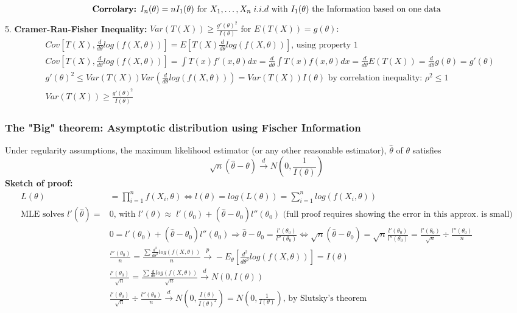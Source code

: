 \documentclass{article}
\begin{document}
\begin{align*}
    \textrm{\textbf{Corrolary:} } I_n(\theta) = nI_1(\theta) \textrm{ for } X_1, \dots, X_n \; i.i.d \textrm{ with } I_{1}(\theta) \textrm{ the Information based on one data}
\end{align*}
5. \textbf{Cramer-Rau-Fisher Inequality:} $Var(T(X)) \geq \frac{g'(\theta)^2}{I(\theta)} \textrm{ for } E(T(X)) = g(\theta):$
\begin{align*}
    & Cov[T(X), \frac{d}{d\theta}log(f(X, \theta))] = E[T(X)\frac{d}{d\theta}log(f(X, \theta))] \textrm{, using property 1}\\
    & Cov[T(X), \frac{d}{d\theta}log(f(X, \theta))] = \int T(x)f'(x, \theta)dx = \frac{d}{d\theta} \int T(x)  f(x, \theta)dx = \frac{d}{d\theta}E(T(X)) = \frac{d}{d\theta}g(\theta) = g'(\theta)\\
    &g'(\theta)^2 \leq Var(T(X))Var \left (\frac{d}{d\theta}log(f(X, \theta)) \right) = Var(T(X))I(\theta) \textrm{ by correlation inequality: } \rho^2 \leq 1\\
    &Var(T(X)) \geq \frac{g'(\theta)^2}{I(\theta)}
\end{align*}
\subsubsection{The "Big" theorem: Asymptotic distribution using Fischer Information}
Under regularity assumptions, the maximum likelihood estimator (or any other reasonable estimator), $\hat{\theta}$ of $\theta$ satisfies
\begin{equation*}
    \sqrt{n}(\hat{\theta} - \theta) \overset{d}{\longrightarrow} N\left(0, \frac{1}{I(\theta)}\right)
\end{equation*}
\textbf{Sketch of proof:}
\begin{align*}
    L(\theta) &= \prod_{i=1}^nf(X_i, \theta) \Longleftrightarrow l(\theta) = log(L(\theta)) = \sum_{i=1}^nlog(f(X_i, \theta))\\
    \textrm{MLE solves } l'(\hat{\theta}) = &0 \textrm{, with } l'(\theta) \approx \; l'(\theta_0) + (\hat{\theta} - \theta_0)l''(\theta_0) \textrm{ (full proof requires showing the error in this approx. is small)}\\
    &0 = l'(\theta_0) + (\hat{\theta} - \theta_0)l''(\theta_0) \Longrightarrow \hat{\theta} - \theta_0 = \frac{l'(\theta_0)}{l''(\theta_0)} \Longleftrightarrow \sqrt{n}(\hat{\theta} - \theta_0) = \sqrt{n}\frac{l'(\theta_0)}{l''(\theta_0)} = \frac{l'(\theta_0)}{\sqrt{n}} \div \frac{l''(\theta_0)}{n}\\
    & \frac{l''(\theta_0)}{n} = \frac{\sum \frac{d^2}{d\theta^2}log(f(X, \theta))}{n} \overset{p}{\longrightarrow}  - E_\theta \left [\frac{d^2}{d\theta^2}log(f(X, \theta)) \right ] = I(\theta)\\
    & \frac{l'(\theta_0)}{\sqrt{n}} = \frac{\sum \frac{d}{d\theta}log(f(X, \theta))}{\sqrt{n}} \overset{d}{\longrightarrow} N(0, I(\theta))\\
    & \frac{l'(\theta_0)}{\sqrt{n}} \div \frac{l''(\theta_0)}{n} \overset{d}{\longrightarrow} N\left(0, \frac{I(\theta)}{I(\theta)^2}\right) = N\left(0, \frac{1}{I(\theta)}\right) \textrm{, by Slutsky's theorem}
\end{align*}
\end{document}
